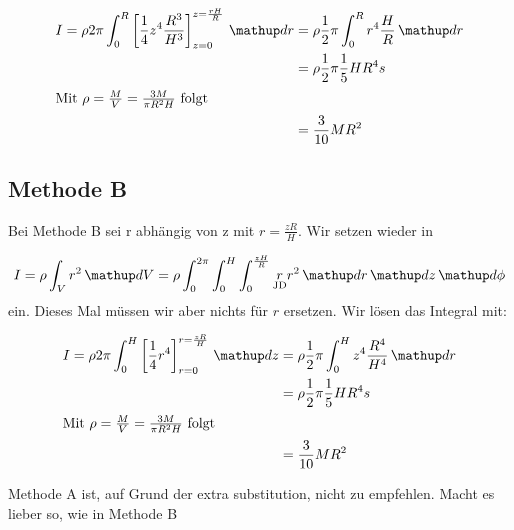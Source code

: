 \begin{align*}
I=\rho 2\pi \int_{0}^{R}\left[\frac{1}{4}z^4\frac{R^3}{H^3}\right]_{z=0}^{z=\frac{rH}{R}}\dv{r}&=\rho \frac{1}{2}\pi \int_{0}^{R} r^4\frac{H}{R}\dv{r}\\
&=\rho \frac{1}{2}\pi \frac{1}{5}H R^4s\\
\intertext{Mit $\rho=\frac{M}{V}=\frac{3M}{\pi R^2H}$ folgt}
&=\frac{3}{10}MR^2
\end{align*}

\subsection{Methode B}
Bei Methode B sei r abhängig von z mit $r=\frac{zR}{H}$. 
Wir setzen wieder in 

\begin{equation*}
I=\rho\int_{V} r^2 \dv{V}=\rho \int_{0}^{2\pi}\int_{0}^{H}\int_{0}^{\frac{zH}{R}} \underset{\text{JD}}{r}r^2\dv{r}\dv{z}\dv{\phi}
\end{equation*}
ein. Dieses Mal müssen wir aber nichts für $r$ ersetzen.
Wir lösen das Integral mit:

\begin{align*}
I=\rho 2\pi \int_{0}^{H}\left[\frac{1}{4}r^4\right]_{r=0}^{r=\frac{zR}{H}}\dv{z}&=\rho \frac{1}{2}\pi \int_{0}^{H} z^4\frac{R^4}{H^4}\dv{r}\\
&=\rho \frac{1}{2}\pi \frac{1}{5}H R^4s\\
\intertext{Mit $\rho=\frac{M}{V}=\frac{3M}{\pi R^2H}$ folgt}
&=\frac{3}{10}MR^2
\end{align*}

\begin{center}
Methode A ist, auf Grund der extra substitution, nicht zu empfehlen.
Macht es lieber so, wie in Methode B
\end{center}
